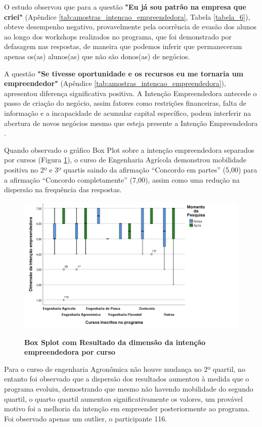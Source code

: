 O estudo observou que para a questão \textbf{"Eu já sou patrão na empresa que criei"} (Apêndice \ref{tab:amostras_intencao_empreendedora}, Tabela \ref{tabela_6}), obteve desempenho negativo, provavelmente pela ocorrência de evasão dos alunos ao longo dos workshops realizados no programa, que foi demonstrado por defasagem nas respostas, de maneira que podemos inferir que permaneceram apenas os(as) alunos(as) que não são donos(as) de negócios. 

A questão \textbf{"Se tivesse oportunidade e os recursos eu me tornaria um empreendedor"} (Apêndice \ref{tab:amostras_intencao_empreendedora}), apresentou diferença significativa positiva. A Intenção Empreendedora antecede o passo de criação do negócio, assim fatores como restrições financeiras, falta de informação e a incapacidade de acumular capital específico, podem interferir na abertura de novos negócios mesmo que esteja presente a Intenção Empreendedora \cite{auguste_what_2016}.

Quando observado o gráfico Box Plot sobre a intenção empreendedora separados por cursos (Figura \ref{figura_boxplot_intencao}), o curso de Engenharia Agrícola demonstrou mobilidade positiva no 2º e 3º quartis saindo da afirmação “Concordo em partes” (5,00) para a afirmação “Concordo completamente” (7,00), assim como uma redução na dispersão na frequência das respostas.


\begin{figure}[H]
\centering
\caption{\textbf{Box Splot com Resultado da dimensão da intenção empreendedora por curso}}
\includegraphics[scale=0.7]{Imagens/boxplot_intencao_empreendedora.png}
\label{figura_boxplot_intencao}
\end{figure}


Para o curso de engenharia Agronômica não houve mudança no 2º quartil, no entanto foi observado que a dispersão dos resultados aumentou à medida que o programa evoluiu, demostrando que mesmo não havendo mobilidade do segundo quartil, o quarto quartil aumentou significativamente os valores, um provável motivo foi a melhoria da intenção em empreender posteriormente ao programa. Foi observado apenas um outlier, o participante 116.

